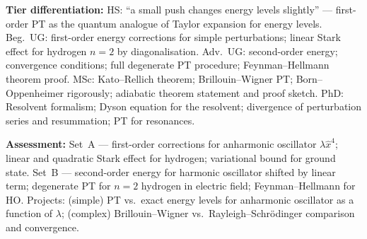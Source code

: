 \documentclass[11pt,a4paper]{article}
\begin{document}
\begin{tcolorbox}[modulebox, title={Module~I.3 / L09: Perturbation Theory}]
\medskip\textbf{Tier differentiation:}
HS: ``a small push changes energy levels slightly'' --- first-order PT as the
quantum analogue of Taylor expansion for energy levels.
Beg.\ UG: first-order energy corrections for simple perturbations;
linear Stark effect for hydrogen $n=2$ by diagonalisation.
Adv.\ UG: second-order energy; convergence conditions; full degenerate PT
procedure; Feynman--Hellmann theorem proof.
MSc: Kato--Rellich theorem; Brillouin--Wigner PT; Born--Oppenheimer rigorously;
adiabatic theorem statement and proof sketch.
PhD: Resolvent formalism; Dyson equation for the resolvent;
divergence of perturbation series and resummation; PT for resonances.

\medskip\textbf{Assessment:}
Set~A --- first-order corrections for anharmonic oscillator $\lambda\hat{x}^4$;
linear and quadratic Stark effect for hydrogen; variational bound for ground state.
Set~B --- second-order energy for harmonic oscillator shifted by linear term;
degenerate PT for $n=2$ hydrogen in electric field; Feynman--Hellmann for HO.
Projects: (simple) PT vs.\ exact energy levels for anharmonic oscillator as a function
of $\lambda$; (complex) Brillouin--Wigner vs.\ Rayleigh--Schr\"odinger comparison and
convergence.
\end{tcolorbox}
\end{document}
